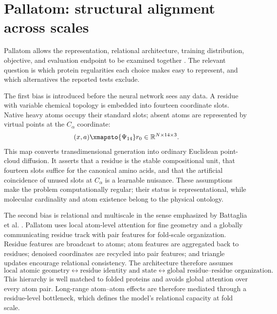 \section{Pallatom: structural alignment across scales}

Pallatom allows the representation, relational architecture, training distribution, objective,
and evaluation endpoint to be examined together \cite{qu2025pallatom}.  The relevant question is
which protein regularities each choice makes easy to represent, and which alternatives the
reported tests exclude.

The first bias is introduced before the neural network sees any data.  A residue with variable
chemical topology is embedded into fourteen coordinate slots.  Native heavy atoms occupy their
standard slots; absent atoms are represented by virtual points at the $C_\alpha$ coordinate:
\begin{equation}
(x,a)\xmapsto{\Psi_{14}}
r_0\in\mathbb R^{N\times14\times3}.
\label{eq:pallatom-atom14-map}
\end{equation}
This map converts transdimensional generation into ordinary Euclidean point-cloud diffusion.  It
asserts that a residue is the stable compositional unit, that fourteen slots suffice for the
canonical amino acids, and that the artificial coincidence of unused slots at $C_\alpha$ is a
learnable nuisance.  These assumptions make the problem computationally regular; their status is
representational, while molecular cardinality and atom existence belong to the physical ontology.

The second bias is relational and multiscale in the sense emphasized by Battaglia et al.
\cite{battaglia2018relational}.  Pallatom uses local atom-level attention for fine geometry and a
globally communicating residue track with pair features for fold-scale organization.  Residue
features are broadcast to atoms; atom features are aggregated back to residues; denoised
coordinates are recycled into pair features; and triangle updates encourage relational
consistency.  The architecture therefore assumes
\begin{equation}
\text{local atomic geometry}
\longleftrightarrow
\text{residue identity and state}
\longleftrightarrow
\text{global residue--residue organization}.
\label{eq:pallatom-relational-bias}
\end{equation}
This hierarchy is well matched to folded proteins and avoids global attention over every atom
pair.  Long-range atom--atom effects are therefore mediated through a residue-level bottleneck,
which defines the model's relational capacity at fold scale.

